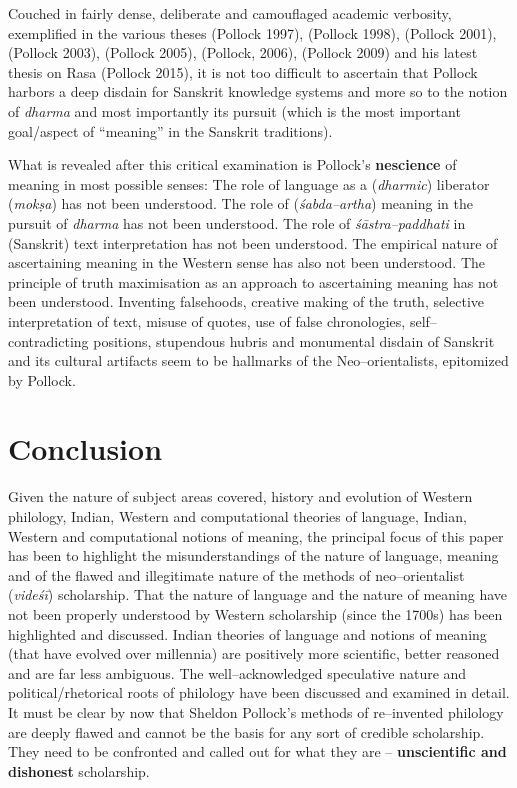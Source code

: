 Couched in fairly dense, deliberate and camouflaged academic verbosity, exemplified in the various theses (Pollock 1997), (Pollock 1998), (Pollock 2001),(Pollock 2003), (Pollock 2005), (Pollock, 2006), (Pollock 2009) and his latest thesis on Rasa (Pollock 2015), it is not too difficult to ascertain that Pollock harbors a deep disdain for Sanskrit knowledge systems and more so to the notion of \textit{dharma} and most importantly its pursuit (which is the most important goal/aspect of “meaning” in the Sanskrit traditions).

What is revealed after this critical examination is Pollock’s \textbf{nescience} of meaning in most possible senses: The role of language as a (\textit{dharmic}) liberator (\textit{mokṣa}) has not been understood. The role of (\textit{śabda–artha}) meaning in the pursuit of \textit{dharma} has not been understood. The role of \textit{śāstra–paddhati} in (Sanskrit) text interpretation has not been understood. The empirical nature of ascertaining meaning in the Western sense has also not been understood. The principle of truth maximisation as an approach to ascertaining meaning has not been understood. Inventing falsehoods, creative making of the truth, selective interpretation of text, misuse of quotes, use of false chronologies, self–contradicting positions, stupendous hubris and monumental disdain of Sanskrit and its cultural artifacts seem to be hallmarks of the Neo–orientalists, epitomized by Pollock.


\section*{Conclusion}

Given the nature of subject areas covered, history and evolution of Western philology, Indian, Western and computational theories of language, Indian, Western and computational notions of meaning, the principal focus of this paper has been to highlight the misunderstandings of the nature of language, meaning and of the flawed and illegitimate nature of the methods of neo–orientalist (\textit{videśī}) scholarship. That the nature of language and the nature of meaning have not been properly understood by Western scholarship (since the 1700s) has been highlighted and discussed. Indian theories of language and notions of meaning (that have evolved over millennia) are positively more scientific, better reasoned and are far less ambiguous. The well–acknowledged speculative nature and political/rhetorical roots of philology have been discussed and examined in detail. It must be clear by now that Sheldon Pollock’s methods of re–invented philology are deeply flawed and cannot be the basis for any sort of credible scholarship. They need to be confronted and called out for what they are – \textbf{unscientific and dishonest} scholarship.

